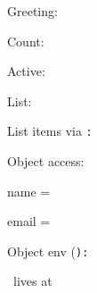 %



\noindent Greeting: \par
\noindent Count:    \par
\noindent Active:   \par
\noindent List:     \par

\bigskip
\noindent List items via \tt\string\forlistitem:\rm\par
\def\rowItem#1{\noindent\quad-- #1\par}

\bigskip
\noindent Object access:\par
\noindent\quad name = \par
\noindent\quad email = \par

\bigskip
\noindent Object env (\tt\string\paramobject\rm):\par
\noindent{}\quad \name\ lives at \email\endparamobject

\bye
